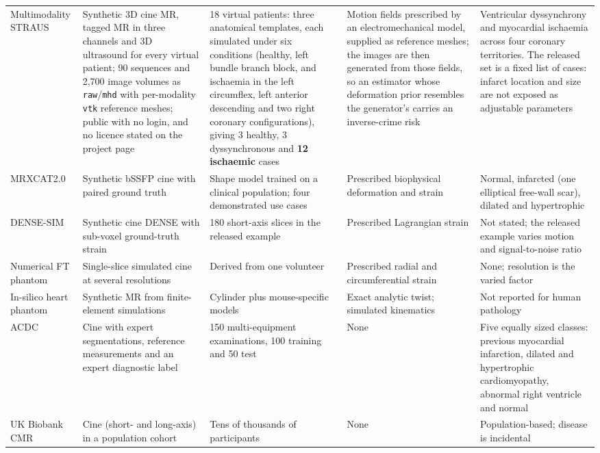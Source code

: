 \begin{longtable}{@{}L{0.17\textwidth}L{0.19\textwidth}L{0.20\textwidth}L{0.17\textwidth}L{0.18\textwidth}@{}}
Multimodality STRAUS~\citep{zhou2018straus} & Synthetic 3D cine MR, tagged MR in three channels and 3D ultrasound for every virtual patient; 90 sequences and 2,700 image volumes as \texttt{raw}/\texttt{mhd} with per-modality \texttt{vtk} reference meshes; public with no login, and no licence stated on the project page & 18 virtual patients: three anatomical templates, each simulated under six conditions (healthy, left bundle branch block, and ischaemia in the left circumflex, left anterior descending and two right coronary configurations), giving 3 healthy, 3 dyssynchronous and \textbf{12 ischaemic} cases & Motion fields prescribed by an electromechanical model, supplied as reference meshes; the images are then generated from those fields, so an estimator whose deformation prior resembles the generator's carries an inverse-crime risk & Ventricular dyssynchrony and myocardial ischaemia across four coronary territories. The released set is a fixed list of cases: infarct location and size are not exposed as adjustable parameters\\
MRXCAT2.0~\citep{mrxcat2023} & Synthetic bSSFP cine with paired ground truth & Shape model trained on a clinical population; four demonstrated use cases & Prescribed biophysical deformation and strain & Normal, infarcted (one elliptical free-wall scar), dilated and hypertrophic\\
DENSE-SIM~\citep{barbaroux2025,densesimrepo} & Synthetic cine DENSE with sub-voxel ground-truth strain & 180 short-axis slices in the released example & Prescribed Lagrangian strain & Not stated; the released example varies motion and signal-to-noise ratio\\
Numerical FT phantom~\citep{adams2023} & Single-slice simulated cine at several resolutions & Derived from one volunteer & Prescribed radial and circumferential strain & None; resolution is the varied factor\\
In-silico heart phantom~\citep{mukherjee2024} & Synthetic MR from finite-element simulations & Cylinder plus mouse-specific models & Exact analytic twist; simulated kinematics & Not reported for human pathology\\
ACDC~\citep{bernard2018acdc} & Cine with expert segmentations, reference measurements and an expert diagnostic label & 150 multi-equipment examinations, 100 training and 50 test & None & Five equally sized classes: previous myocardial infarction, dilated and hypertrophic cardiomyopathy, abnormal right ventricle and normal\\
UK Biobank CMR~\citep{petersen2016ukb} & Cine (short- and long-axis) in a population cohort & Tens of thousands of participants & None & Population-based; disease is incidental\\

\end{longtable}
